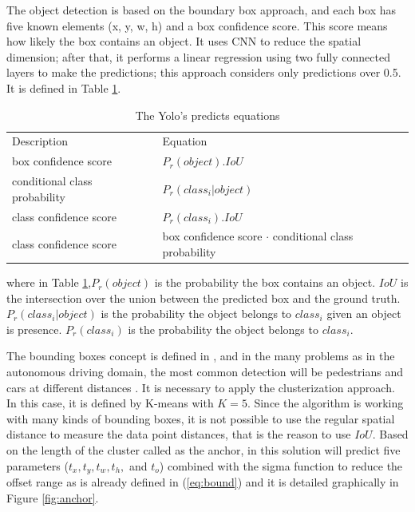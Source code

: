 The object detection is based on the boundary box approach, and each box has five known elements (x, y, w, h) and a box confidence score. This score means how likely the box contains an object. It uses CNN to reduce the spatial dimension; after that, it performs a linear regression using two fully connected layers to make the predictions; this approach considers only predictions over 0.5. It is defined in Table \ref{eq:prob_yolo}. 


\begin{table}[H]
\centering
\caption{The Yolo's predicts equations}
\begin{tabular}{l|l} 
\toprule
Description~                   & Equation                                                                 \\
box confidence score           & $P_r(object).IoU$                                                     \\
conditional class probability~ & $P_r(class_i|object)$                                       \\
class confidence score         & $P_r(class_i).IoU$                                                   \\
class confidence score         & box confidence score $\cdot$ conditional class probability  \\
\bottomrule
\end{tabular}
\label{eq:prob_yolo}
\end{table}

where in Table \ref{eq:prob_yolo},$P_r(object)$ is the probability the box contains an object.
$IoU$ is the intersection over the union between the predicted box and the ground truth.
$P_r(class_i|object)$ is the probability the object belongs to $class_i$ given an object is presence.
$P_r(class_i)$ is the probability the object belongs to $class_i$.

The bounding boxes concept is defined in \cite{redmon2017yolo9000}, and in the many problems as in the autonomous driving domain, the most common detection will be pedestrians and cars at different distances \cite{ess2010object}.  It is necessary to apply the clusterization approach. In this case, it is defined by K-means with $K=5$. Since the algorithm is working with many kinds of bounding boxes, it is not possible to use the regular spatial distance to measure the data point distances, that is the reason to use $IoU$. Based on the length of the cluster called as the anchor, in this solution will predict five parameters ($t_x, t_y, t_w, t_h,$ and $t_o$) combined with the sigma function to reduce the offset range as is already defined in (\ref{eq:bound}) and it is detailed graphically in Figure \ref{fig:anchor}.


